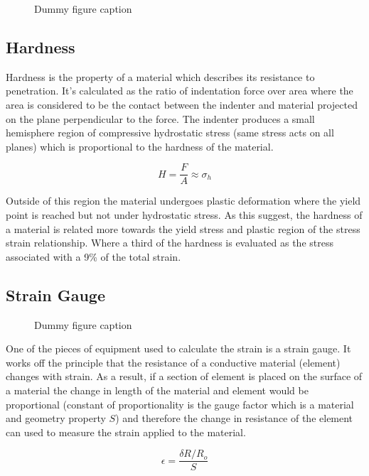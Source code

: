 \documentclass[a4paper,10pt]{article}
\begin{document}
\begin{figure}[h]
  \caption{Dummy figure caption}
  \label{fig:dummy 1}
\end{figure}

\subsection{Hardness}
Hardness is the property of a material which describes its resistance to penetration. It's calculated as the ratio of indentation force over area where the area is considered to be the contact between the indenter and material projected on the plane perpendicular to the force. The indenter produces a small hemisphere region of compressive hydrostatic stress (same stress acts on all planes) which is proportional to the hardness of the material.

\begin{equation}
 \label{Hardness and Hydrostatic stress}
 H = \frac{F}{A} \approx \sigma_h
\end{equation}

Outside of this region the material undergoes plastic deformation where the yield point is reached but not under hydrostatic stress. As this suggest, the hardness of a material is related more towards the yield stress and plastic region of the stress strain relationship. Where a third of the hardness is evaluated as the stress associated with a 9\% of the total strain. 

\subsection{Strain Gauge}
\begin{figure}[h]
  \caption{Dummy figure caption}
  \label{fig:dummy 1}
\end{figure}

One of the pieces of equipment used to calculate the strain is a strain gauge. It works off the principle that the resistance of a conductive material (element) changes with strain. As a result, if a section of element is placed on the surface of a material the change in length of the material and element would be proportional (constant of proportionality is the gauge factor which is a material and geometry property $S$)  and therefore the change in resistance of the element can used to measure the strain applied to the material. 

\begin{equation}
 \label{Strain Gauge}
 \epsilon = \frac{\delta R/ R_o}{S}
\end{equation}
\end{document}
